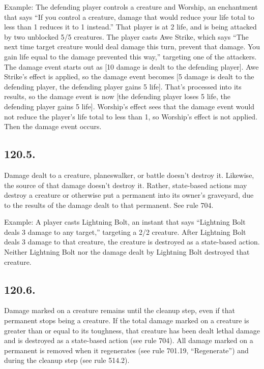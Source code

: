 Example: The defending player controls a creature and Worship, an enchantment that says “If you control a creature, damage that would reduce your life total to less than 1 reduces it to 1 instead.” That player is at 2 life, and is being attacked by two unblocked 5/5 creatures. The player casts Awe Strike, which says “The next time target creature would deal damage this turn, prevent that damage. You gain life equal to the damage prevented this way,” targeting one of the attackers. The damage event starts out as [10 damage is dealt to the defending player]. Awe Strike’s effect is applied, so the damage event becomes [5 damage is dealt to the defending player, the defending player gains 5 life]. That’s processed into its results, so the damage event is now [the defending player loses 5 life, the defending player gains 5 life]. Worship’s effect sees that the damage event would not reduce the player’s life total to less than 1, so Worship’s effect is not applied. Then the damage event occurs.

\subsection*{120.5.}
Damage dealt to a creature, planeswalker, or battle doesn’t destroy it. Likewise, the source of that damage doesn’t destroy it. Rather, state-based actions may destroy a creature or otherwise put a permanent into its owner’s graveyard, due to the results of the damage dealt to that permanent. See rule 704.

Example: A player casts Lightning Bolt, an instant that says “Lightning Bolt deals 3 damage to any target,” targeting a 2/2 creature. After Lightning Bolt deals 3 damage to that creature, the creature is destroyed as a state-based action. Neither Lightning Bolt nor the damage dealt by Lightning Bolt destroyed that creature.

\subsection*{120.6.}
Damage marked on a creature remains until the cleanup step, even if that permanent stops being a creature. If the total damage marked on a creature is greater than or equal to its toughness, that creature has been dealt lethal damage and is destroyed as a state-based action (see rule 704). All damage marked on a permanent is removed when it regenerates (see rule 701.19, “Regenerate”) and during the cleanup step (see rule 514.2).

